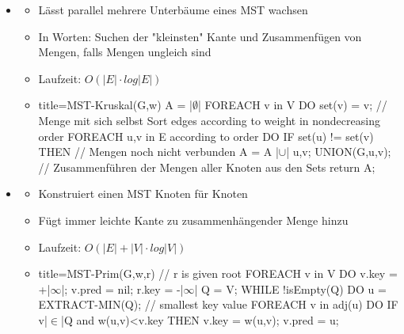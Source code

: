 \documentclass[
    12pt,
    a4paper,
    ngerman,
    color=3b,%
    marginpar=false,
    colorback=false,
    leqno,
]{tudaexercise}
\begin{document}
\begin{itemize}
        \item {}
            \begin{itemize}
                \item Lässt parallel mehrere Unterbäume eines MST wachsen
                \item In Worten: Suchen der \string"kleinsten\string" Kante und Zusammenfügen von Mengen, falls Mengen ungleich sind
                \item Laufzeit: $O(|E| \cdot log|E|)$
                \item[]
                    \begin{ccode}[autogobble,escapeinside=||,fontsize=\small]{title={MST-Kruskal(G,w)}}
                    A = |$\emptyset$|
                    FOREACH v in V DO
                        set(v) = {v};       // Menge mit sich selbst
                    Sort edges according to weight in nondecreasing order
                    FOREACH {u,v} in E according to order DO
                        IF set(u) != set(v) THEN    // Mengen noch nicht verbunden
                            A = A |$\cup$| {{u,v}}; 
                            UNION(G,u,v);   // Zusammenführen der Mengen aller Knoten aus den Sets
                    return A;
                    \end{ccode}
            \end{itemize}
            \clearpage
        \item {}
            \begin{itemize}
                \item Konstruiert einen MST Knoten für Knoten
                \item Fügt immer leichte Kante zu zusammenhängender Menge hinzu
                \item Laufzeit: $O(|E| + |V| \cdot log|V|)$
                \item[]
                    \begin{ccode}[autogobble,escapeinside=||]{title={MST-Prim(G,w,r) // r is given root}}
                    FOREACH v in V DO 
                        v.key = +|$\infty$|;
                        v.pred = nil;
                    r.key = -|$\infty$|
                    Q = V;
                    WHILE !isEmpty(Q) DO
                        u = EXTRACT-MIN(Q);     // smallest key value
                        FOREACH v in adj(u) DO
                            IF v|$\in$|Q and w({u,v})<v.key THEN
                                v.key = w({u,v});
                                v.pred = u;
                    \end{ccode}
            \end{itemize}
        
    \end{itemize}
\end{document}
